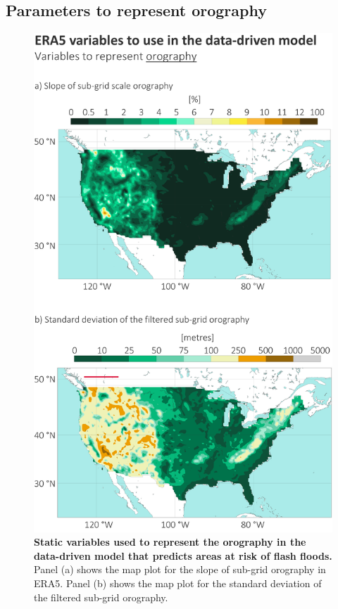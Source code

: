 \subsection{Parameters to represent orography}

\begin{figure}[htbp]
\centering
\includegraphics[width=\textwidth]{orography.png}
\caption{\textbf{Static variables used to represent the orography in the data-driven model that predicts areas at risk of flash floods.} Panel (a) shows the map plot for the slope of sub-grid orography in ERA5. Panel (b) shows the map plot for the standard deviation of the filtered sub-grid orography.}
\label{fig:orography}
\end{figure}


